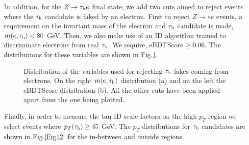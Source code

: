 In addition, for the $Z\to\tau_\text{h} e$ final state, we add two cuts aimed to reject events where the $\tau_\text{h}$ candidate is faked by an electron. First to reject $Z\to ee$ events, a requirement on the invariant mass of the electron and $\tau_\text{h}$ candidate is made, $m(e,\tau_\text{h})<80$ GeV. Then, we also make use of an ID algorithm trained to discriminate electrons from real $\tau_\text{h}$. We require, eBDTScore$\geq 0.06$. The distributions for these variables are shown in Fig.\ref{Fig11}.
\begin{figure}[H]
	\centering
	\hfill
	\caption{Distribution of the variables used for rejecting $\tau_\text{h}$ fakes coming from electrons. On the right $m(e,\tau_\text{h})$ distribution (a) and on the left the eBDTScore distribution (b). All the other cuts have been applied apart from the one being plotted.}
	\label{Fig11}
\end{figure}
Finally, in order to measure the tau ID scale factors on the high-$p_T$ region we select events where $p_T(\tau_\text{h})\geq 45$ GeV. The $p_T$ distributions for $\tau_\text{h}$ candidates are shown in Fig.\ref{Fig12} for the in-between and outside regions.
